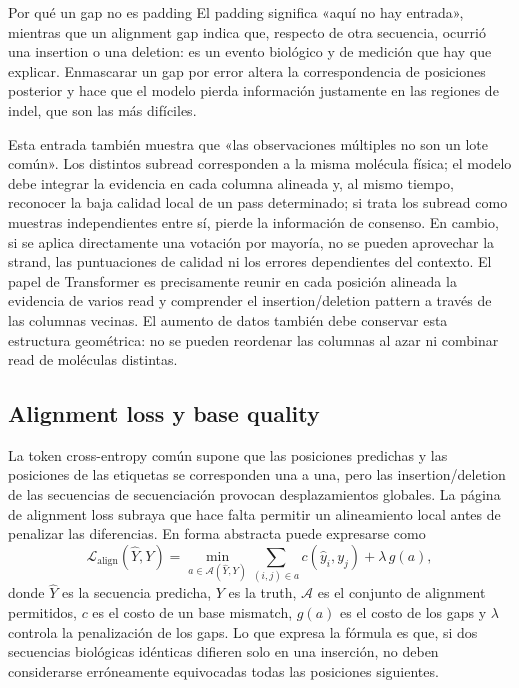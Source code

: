 \documentclass[a4paper]{article}
\begin{document}
\begin{warningbox}{Por qué un gap no es padding}
El padding significa «aquí no hay entrada», mientras que un alignment gap indica que, respecto de otra secuencia, ocurrió una insertion o una deletion: es un evento biológico y de medición que hay que explicar. Enmascarar un gap por error altera la correspondencia de posiciones posterior y hace que el modelo pierda información justamente en las regiones de indel, que son las más difíciles.
\end{warningbox}

Esta entrada también muestra que «las observaciones múltiples no son un lote común». Los distintos subread corresponden a la misma molécula física; el modelo debe integrar la evidencia en cada columna alineada y, al mismo tiempo, reconocer la baja calidad local de un pass determinado; si trata los subread como muestras independientes entre sí, pierde la información de consenso. En cambio, si se aplica directamente una votación por mayoría, no se pueden aprovechar la strand, las puntuaciones de calidad ni los errores dependientes del contexto. El papel de Transformer es precisamente reunir en cada posición alineada la evidencia de varios read y comprender el insertion/deletion pattern a través de las columnas vecinas. El aumento de datos también debe conservar esta estructura geométrica: no se pueden reordenar las columnas al azar ni combinar read de moléculas distintas.

\subsection{Alignment loss y base quality}

La token cross-entropy común supone que las posiciones predichas y las posiciones de las etiquetas se corresponden una a una, pero las insertion/deletion de las secuencias de secuenciación provocan desplazamientos globales. La página de alignment loss subraya que hace falta permitir un alineamiento local antes de penalizar las diferencias. En forma abstracta puede expresarse como
$$
\mathcal{L}_{\text{align}}(\hat Y,Y)=
\min_{a\in\mathcal{A}(\hat Y,Y)}
\sum_{(i,j)\in a} c(\hat y_i,y_j)+\lambda\,g(a),
$$
donde $\hat Y$ es la secuencia predicha, $Y$ es la truth, $\mathcal{A}$ es el conjunto de alignment permitidos, $c$ es el costo de un base mismatch, $g(a)$ es el costo de los gaps y $\lambda$ controla la penalización de los gaps. Lo que expresa la fórmula es que, si dos secuencias biológicas idénticas difieren solo en una inserción, no deben considerarse erróneamente equivocadas todas las posiciones siguientes.
\end{document}
